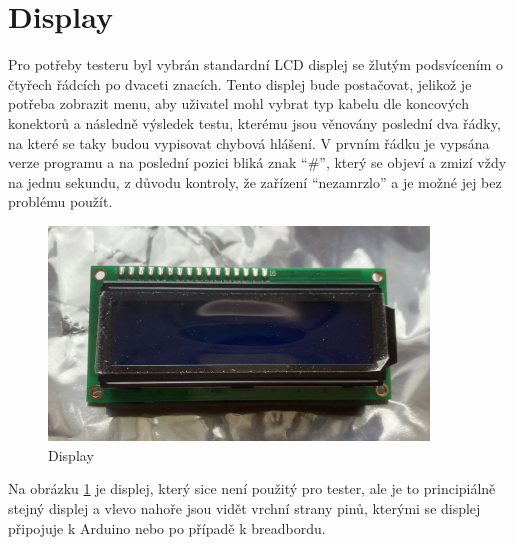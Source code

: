 
\section{Display}

Pro potřeby testeru byl vybrán standardní LCD displej se žlutým podsvícením o čtyřech řádcích po dvaceti znacích. Tento displej bude postačovat, jelikož je potřeba zobrazit menu, aby uživatel mohl vybrat typ kabelu dle koncových konektorů a následně výsledek testu, kterému jsou věnovány poslední dva řádky, na které se taky budou vypisovat chybová hlášení. V prvním řádku je vypsána verze programu a na poslední pozici bliká znak “\#”, který se objeví a zmizí vždy na jednu sekundu, z důvodu kontroly, že zařízení “nezamrzlo” a je možné jej bez problému použít.

\begin{figure}[H]
	\centering
	\includegraphics[width=0.9\textwidth]{pictures/display.jpeg}
    	\caption{Display}
   	\label{fig:displayHW}
\end{figure}

Na obrázku \ref{fig:displayHW} je displej, který sice není použitý pro tester, ale je to principiálně stejný displej a vlevo nahoře jsou vidět vrchní strany pinů, kterými se displej připojuje k Arduino nebo po případě k breadbordu.